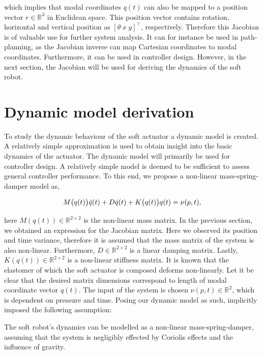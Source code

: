 which implies that modal coordinates $q(t)$ can also be mapped to a position vector $r\in \mathbb{R}^3$ in Euclidean space. This position vector contains rotation, horizontal and vertical position as $[\theta \hspace{3pt} x \hspace{3pt} y]^\top$, respectively. Therefore this Jacobian is of valuable use for further system analysis. It can for instance be used in path-planning, as the Jacobian inverse can map Cartesian coordinates to modal coordinates. Furthermore, it can be used in controller design. However, in the next section, the Jacobian will be used for deriving the dynamics of the soft robot. 


\section{Dynamic model derivation}


To study the dynamic behaviour of the soft actuator a dynamic model is created. A relatively simple approximation is used to obtain insight into the basic dynamics of the actuator. The dynamic model will primarily be used for controller design. A relatively simple model is deemed to be sufficient to assess general controller performance. To this end, we propose a non-linear mass-spring-damper model as, 


\begin{equation}
    M\big(q(t)\big)\Ddot{q}(t) + D\dot{q}(t) + K\big(q(t)\big)q(t) = \nu(p,t),
    \label{eq2:simp_model}
\end{equation}


here $M(q(t)) \in \mathbb{R}^{2\times 2}$ is the non-linear mass matrix. In the previous section, we obtained an expression for the Jacobian matrix. Here we observed its position and time variance, therefore it is assumed that the mass matrix of the system is also non-linear. Furthermore, $D \in \mathbb{R}^{2\times2}$ is a linear damping matrix. Lastly, $K(q(t)) \in \mathbb{R}^{2\times 2}$ is a non-linear stiffness matrix. It is known that the elastomer of which the soft actuator is composed deforms non-linearly. Let it be clear that the desired matrix dimensions correspond to length of modal coordinate vector $q(t)$. The input of the system is chosen $\nu(p,t) \in \mathbb{R}^2$, which is dependent on pressure and time. Posing our dynamic model as such, implicitly imposed the following assumption:

\begin{theorem}
The soft robot's dynamics can be modelled as a non-linear mass-spring-damper, assuming that the system is negligibly effected by Coriolis effects and the influence of gravity.
\end{theorem}

